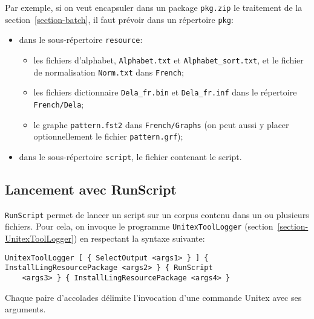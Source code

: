 \bigskip
\noindent Par exemple, si on veut encapsuler dans un package \verb$pkg.zip$ le traitement de la
section~\ref{section-batch}, il faut prévoir dans un répertoire \verb$pkg$:
\begin{itemize}
\item dans le sous-répertoire \verb$resource$:
\begin{itemize}
\item les fichiers d'alphabet, \verb$Alphabet.txt$ et \verb$Alphabet_sort.txt$, et le fichier de
normalisation \verb$Norm.txt$ dans \verb$French$;
\item les fichiers dictionnaire \verb$Dela_fr.bin$ et \verb$Dela_fr.inf$ dans le répertoire
\verb$French/Dela$;
\item le graphe \verb$pattern.fst2$ dans \verb$French/Graphs$ (on peut aussi y placer optionnellement
le fichier \verb$pattern.grf$);
\end{itemize}
\item dans le sous-répertoire \verb$script$, le fichier contenant le script.
\end{itemize}



\subsection{Lancement avec RunScript}
\label{section-runscript}
\verb$RunScript$ permet de lancer un script sur un corpus contenu dans un ou plusieurs fichiers.
Pour cela, on invoque le programme \verb$UnitexToolLogger$ (section~\ref{section-UnitexToolLogger})
en respectant la syntaxe suivante:

\begin{Verbatim}[fontsize=\small,fontfamily=helvetica]
UnitexToolLogger [ { SelectOutput <args1> } ] { InstallLingResourcePackage <args2> } { RunScript
    <args3> } { InstallLingResourcePackage <args4> }
\end{Verbatim}

\noindent Chaque paire d'accolades délimite l'invocation d'une commande Unitex avec ses arguments.

